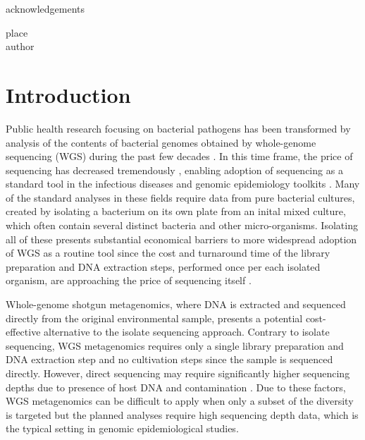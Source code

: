 \documentclass[officiallayout]{tktla}
\begin{document}
\begin{acknowledgements}
  acknowledgements
   \begin{flushright}
  place\\
  author
  \end{flushright}
\end{acknowledgements}

\tableofcontents

\mainmatter

\chapter{Introduction}

Public health research focusing on bacterial pathogens has been
transformed by analysis of the contents of bacterial genomes obtained
by whole-genome sequencing (WGS) during the past few decades
\citep{armstrong2019pathogen}. In this time frame, the price of
sequencing has decreased tremendously \citep{dnaseqcost,
  goodwin2016coming}, enabling adoption of sequencing as a standard
tool in the infectious diseases and genomic epidemiology toolkits
\citep{tang2017infection, grad2014epidemiologic, kwong2015whole}. Many
of the standard analyses in these fields require data from pure
bacterial cultures, created by isolating a bacterium on its own plate
from an inital mixed culture, which often contain several distinct
bacteria and other micro-organisms. Isolating all of these presents
substantial economical barriers to more widespread adoption of WGS as
a routine tool since the cost and turnaround time of the library
preparation and DNA extraction steps, performed once per each isolated
organism, are approaching the price of sequencing itself \citep{rossen2018practical}.

Whole-genome shotgun metagenomics, where DNA is extracted and
sequenced directly from the original environmental sample, presents a
potential cost-effective alternative to the isolate sequencing
approach. Contrary to isolate sequencing, WGS metagenomics requires
only a single library preparation and DNA extraction step and no
cultivation steps since the sample is sequenced directly. However,
direct sequencing may require significantly higher sequencing depths
due to presence of host DNA \citep{pereira2019impact,
  mcardle2020sensitivity} and contamination
\citep{mcardle2020sensitivity, salter2014reagent}. Due to these
factors, WGS metagenomics can be difficult to apply when only a subset
of the diversity is targeted but the planned analyses require high
sequencing depth data, which is the typical setting in genomic
epidemiological studies.
\end{document}
